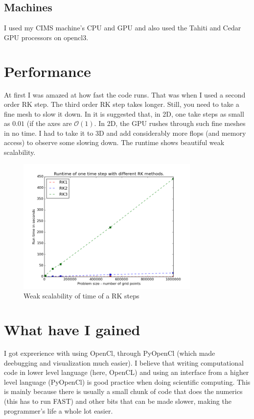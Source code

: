 \documentclass[paper=a4, fontsize=11pt]{scrartcl} %
\numberwithin{equation}{section} %
\numberwithin{figure}{section} %
\numberwithin{table}{section} %
\begin{document}
\subsection{Machines}
I used my CIMS machine's CPU and GPU and also used the Tahiti and Cedar GPU processors on opencl3.



\section{Performance}
At first I was amazed at how fast the code runs. That was when I used a second order RK step. 
The third order RK step takes longer. Still, you need to take a fine mesh to slow it down. 
In \cite{terroris} it is suggested that, in 2D, one take steps as small as $0.01$ (if the axes are $\mathcal{O}(1)$.
In 2D, the GPU rushes through such fine meshes in no time. I had to take it to 3D and add considerably
more flops (and memory access) to observe some slowing down.
The runtime shows beautiful weak scalability.

\begin{figure}[ht!]
\centering
\includegraphics[width=90mm]{3d.png}
\caption{Weak scalability of time of a RK steps \label{overflow}}
\end{figure}

\section{What have I gained}
I got exprerience with using OpenCl, through PyOpenCl (which made deebugging and visualization much easier). I believe that writing 
computational code in lower level language (here, OpenCL) and using an interface from a higher level language (PyOpenCl) is good
practice when doing scientific computing. This is mainly because there is usually a small chunk of code that does the numerics (this has to 
run FAST) and other bits that can be made slower, making the programmer's life a whole lot easier.
\end{document}

